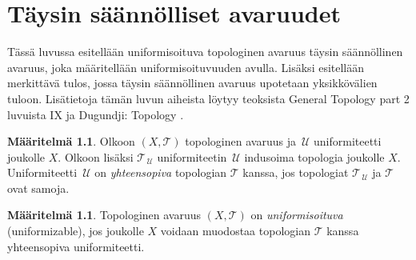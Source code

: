 \documentclass[12pt,a4paper,leqno]{report}
\newcommand{\U}{\,\mathcal{U}}
\newcommand{\T}{\mathcal{T}}
\theoremstyle{plain}
\newtheorem{kor}[equation]{Korollaari}
\theoremstyle{definition}
\newtheorem{maar}[equation]{Määritelmä}
\theoremstyle{remark}
\begin{document}
\chapter{Täysin säännölliset avaruudet}
Tässä luvussa esitellään uniformisoituva topologinen avaruus  
täysin säännöllinen avaruus, joka määritellään uniformisoituvuuden avulla. 
Lisäksi esitellään merkittävä tulos, jossa täysin säännöllinen avaruus upotetaan yksikkövälien tuloon. 
Lisätietoja tämän luvun aiheista löytyy teoksista General Topology part 2 \cite{Eom2} luvuista IX ja Dugundji: Topology \cite{Dugu}.
\begin{maar}
Olkoon $(X,\T)$ topologinen avaruus ja 
$\U$ uniformiteetti joukolle $X$. 
Olkoon lisäksi $\T_{\U}$ uniformiteetin $\U$ indusoima topologia joukolle $X$. 
Uniformiteetti $\U$ on \emph{yhteensopiva} topologian $\T$ kanssa, 
jos topologiat $\T_{\U}$ ja $\T$ ovat samoja.
\end{maar}
%
\begin{maar}
Topologinen avaruus $(X,\T)$ on \emph{uniformisoituva} (uniformizable), jos joukolle $X$ voidaan muodostaa topologian $\T$ kanssa yhteensopiva uniformiteetti.
\end{maar}
\end{document}
